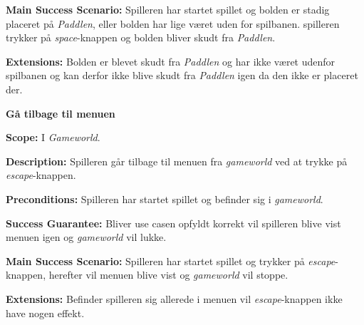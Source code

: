 \textbf{Main Success Scenario:}\newline
Spilleren har startet spillet og bolden er stadig placeret på \textit{Paddlen}, eller bolden har lige været uden for spilbanen. spilleren trykker på \textit{space}-knappen og bolden bliver skudt fra \textit{Paddlen}.\newline

\textbf{Extensions:}\newline
Bolden er blevet skudt fra \textit{Paddlen} og har ikke været udenfor spilbanen og kan derfor ikke blive skudt fra \textit{Paddlen} igen da den ikke er placeret der.\newline \newline


\textbf{Gå tilbage til menuen}\newline

\textbf{Scope:}\newline
I \textit{Gameworld}.\newline

\textbf{Description:} \newline
Spilleren går tilbage til menuen fra \textit{gameworld} ved at trykke på \textit{escape}-knappen.\newline

\textbf{Preconditions:}\newline
Spilleren har startet spillet og befinder sig i \textit{gameworld}.\newline

\textbf{Success Guarantee:}\newline
Bliver use casen opfyldt korrekt vil spilleren blive vist menuen igen og \textit{gameworld} vil lukke.\newline

\textbf{Main Success Scenario:}\newline
Spilleren har startet spillet og trykker på \textit{escape}-knappen, herefter vil menuen blive vist og \textit{gameworld} vil stoppe. \newline

\textbf{Extensions:}\newline
Befinder spilleren sig allerede i menuen vil \textit{escape}-knappen ikke have nogen effekt.\newline